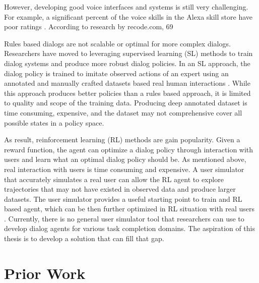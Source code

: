However, developing good voice interfaces and systems is still very challenging. For example, a significant percent of the voice skills in the Alexa skill store have poor ratings \cite{rey_2017}. According to research by recode.com, 69%

Rules based dialogs are not scalable or optimal for more complex dialogs. Researchers have moved to leveraging supervised learning (SL) methods to train dialog systems and produce more robust dialog policies. In an SL approach, the dialog policy is trained to imitate observed actions of an expert using an annotated and manually crafted datasets based real human interactions \cite{Schatzmann2006ASO}. While this approach produces better policies than a rules based approach, it is limited to quality and scope of the training data. Producing deep annotated dataset is time consuming, expensive, and the dataset may not comprehensive cover all possible states in a policy space.

As result, reinforcement learning (RL) methods are gain popularity. Given a reward function, the agent can optimize a dialog policy through interaction with users and learn what an optimal dialog policy should be. As mentioned above, real interaction with users is time consuming and expensive. A user simulator that accurately simulates a real user can allow the RL agent to explore trajectories that may not have existed in observed data and produce larger datasets. The user simulator provides a useful starting point to train and RL based agent, which can be then further optimized in RL situation with real users \cite{li_usersim}. Currently, there is no general user simulator tool that researchers can use to develop dialog agents for various task completion domains. The aspiration of this thesis is to develop a solution that can fill that gap. 

\section{Prior Work}
\label{sec:priorworks}


